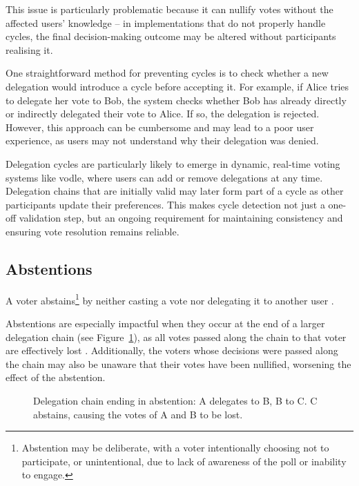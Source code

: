 This issue is particularly problematic because it can nullify votes without the affected users' knowledge -- in implementations that do not properly handle cycles, the final decision-making outcome may be altered without participants realising it.

One straightforward method for preventing cycles is to check whether a new delegation would introduce a cycle before accepting it. For example, if Alice tries to delegate her vote to Bob, the system checks whether Bob has already directly or indirectly delegated their vote to Alice. If so, the delegation is rejected. However, this approach can be cumbersome and may lead to a poor user experience, as users may not understand why their delegation was denied.

Delegation cycles are particularly likely to emerge in dynamic, real-time voting systems like vodle, where users can add or remove delegations at any time. Delegation chains that are initially valid may later form part of a cycle as other participants update their preferences. This makes cycle detection not just a one-off validation step, but an ongoing requirement for maintaining consistency and ensuring vote resolution remains reliable.

\subsection*{Abstentions}

A voter abstains\footnote{Abstention may be deliberate, with a voter intentionally choosing not to participate, or unintentional, due to lack of awareness of the poll or inability to engage.} by neither casting a vote nor delegating it to another user \citep{brill_liquid_2022}.

Abstentions are especially impactful when they occur at the end of a larger delegation chain (see Figure~\ref{fig:delegation-abstention}), as all votes passed along the chain to that voter are effectively lost \citep{brill_liquid_2022}. Additionally, the voters whose decisions were passed along the chain may also be unaware that their votes have been nullified, worsening the effect of the abstention.

\begin{figure}[H]
  \centering
  \caption{Delegation chain ending in abstention: A delegates to B, B to C. C abstains, causing the votes of A and B to be lost.}
  \label{fig:delegation-abstention}
\end{figure}


